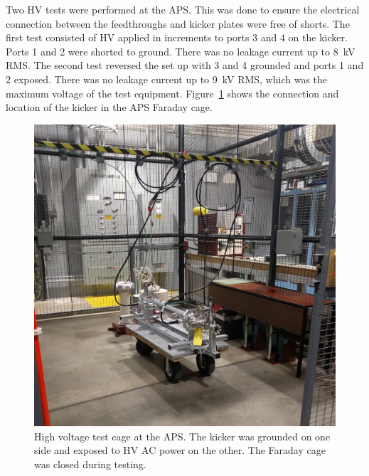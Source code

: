 Two HV tests were performed at the APS. This was done to ensure the electrical connection 
between the feedthroughs and kicker plates were free of shorts. 
The first test consisted of HV applied in increments to ports 3 and 4 on the kicker.  
Ports 1 and 2 were shorted to ground. There was no leakage current up to \SI{8}{kV} RMS.
The second test reversed the set up with 3 and 4 grounded and ports 1 and 2 exposed. 
There was no leakage current up to \SI{9}{kV} RMS, which was the maximum voltage of the test equipment.
Figure~\ref{fig:AWAHVkicker} shows the connection and location of the kicker in the APS Faraday cage.
\begin{figure}%
	\begin{center}
		\includegraphics[width=\textwidth]{./images/kicker1}
		\caption{High voltage test cage at the APS. 
			The kicker was grounded on one side and exposed to HV AC power on the other. 
			The Faraday cage was closed during testing. }
		\label{fig:AWAHVkicker}
	\end{center}
\end{figure}


